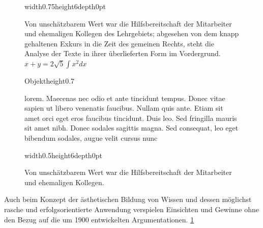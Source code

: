 \documentclass[english,ngerman]{book}%
\theoremstyle{dgdef}
\theoremstyle{dgthm}
\begin{document}
\begin{figure}[t]
\leavevmode\textcolor[gray]{0.9}{\vrule width0.75\hsize height6\baselineskip depth0pt}
\caption[Von unschätzbarem Wert]{Von unschätzbarem Wert war die Hilfsbereitschaft der Mitarbeiter und ehemaligen Kollegen
  des Lehrgebiets; abgesehen von dem knapp gehaltenen Exkurs in die Zeit des gemeinen Rechts, steht
  die Analyse der Texte in ihrer überlieferten Form im Vordergrund. $x+y=2\sqrt{5}\int x^2{d}x$}\label{fig:1}
\end{figure}

\begin{figure}
  Objekt\vrule height0.7\baselineskip
  \caption[lorem. Maecenas nec odio et ante tincidunt tempus.]{lorem. Maecenas nec odio et ante tincidunt tempus. Donec vitae sapien ut libero venenatis faucibus. Nullam quis ante. Etiam sit amet orci eget eros faucibus tincidunt. Duis leo. Sed fringilla mauris sit amet nibh. Donec sodales sagittis magna. Sed consequat, leo eget bibendum sodales, augue velit cursus nunc}
\end{figure}


\begin{figure} %
\leavevmode\textcolor[gray]{0.9}{\vrule width0.5\hsize height6\baselineskip depth0pt}
\caption[Von unschätzbarem Wert]{Von unschätzbarem Wert war die Hilfsbereitschaft der Mitarbeiter und ehemaligen Kollegen.}\label{fig:2}
\end{figure}

\noindent
Auch beim Konzept der ästhetischen Bildung von Wissen und dessen möglichst rasche und
erfolgsorientierte Anwendung verspielen Einsichten und Gewinne ohne den Bezug auf die um 1900
entwickelten Argumentationen. \ref{fig:1}

\newpage
\end{document}
